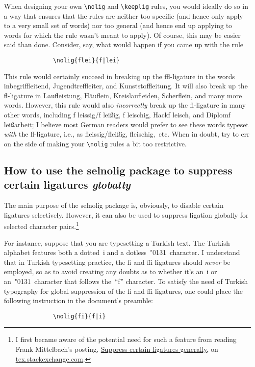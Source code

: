 \documentclass[11pt]{article}
\newcommand{\pkg}[1]{\textsf{#1}}
\newcommand{\cmmd}[1]{\texttt{\textbackslash #1}}
\begin{document}
When designing your own \cmmd{nolig} and \cmmd{keeplig} rules, you would ideally do so in a way that ensures that the rules are neither too specific (and hence only apply to a very small set of words) nor too general (and hence end up applying to words for which the rule wasn't meant to apply). 
Of course, this may be easier said than done. Consider, say, what would happen if you came up with the rule
\begin{Verbatim}
              \nolig{flei}{f|lei}
\end{Verbatim}
This rule would certainly succeed in breaking up the ffl-ligature in the words inbegriffleitend, Jugendtreffleiter, and Kunststoffleitung. It will also break up the fl-ligature in Laufleistung, Häuflein, Kreislaufleiden, Scherflein, and many more words. However, this rule would also \emph{incorrectly} break up the fl-ligature in many other words, including f\kern0pt leissig\slash f\kern0pt leißig, f\kern0pt leischig, Hackf\kern0pt leisch, and Diplomf\kern0pt leißarbeit; I believe most German readers would prefer to see these words typeset \emph{with} the fl-ligature, i.e., as fleissig\slash fleißig, fleischig,~etc. When in doubt, try to err on the side of making your \cmmd{nolig} rules a bit too restrictive.



\subsection[How to use the selnolig package to suppress certain ligatures globally]{How to use the \pkg{selnolig} package to suppress certain ligatures \emph{globally}}
\label{sec:global-nolig}


The main purpose of the \pkg{selnolig} package is, obviously, to disable certain ligatures selectively. However, it can also be used to suppress ligation globally for selected character pairs.\footnote{I first became aware of the potential need for such a feature from reading Frank Mittelbach's posting, \href{http://tex.stackexchange.com/q/61042/5001}{Suppress certain ligatures generally}, on \href{http://tex.stackexchange.com/}{tex.stackexchange.com}.} 

For instance, suppose that you are typesetting a Turkish text. The Turkish alphabet features both a dotted~i and a dotless~\char"0131\ character. I understand that in Turkish typesetting practice, the fi and ffi ligatures should \emph{never} be employed, so as to avoid creating any doubts as to whether it's an~i or an~\char"0131\ character that follows the~\enquote{f} character. To satisfy the need of Turkish typography for global suppression of the fi and ffi ligatures, one could place the following instruction in the document's preamble:
\begin{Verbatim}
              \nolig{fi}{f|i}
\end{Verbatim}
\end{document}
